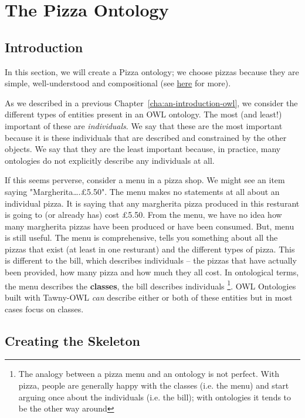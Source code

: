 \chapter{The Pizza Ontology}
\label{cha:pizza-ontology}

\section{Introduction}
\label{sec:introduction}

In this section, we will create a Pizza ontology; we choose pizzas because
they are simple, well-understood and compositional (see
\href{http://robertdavidstevens.wordpress.com/2010/01/22/why-the-pizza-ontology-tutorial/}{here}
for more).

As we described in a previous Chapter~\ref{cha:an-introduction-owl},
we consider the different types of entities present in an OWL
ontology. The most (and least!) important of these are
\emph{individuals}. We say that these are the most important because
it is these individuals that are described and constrained by the
other objects. We say that they are the least important because, in
practice, many ontologies do not explicitly describe any individuals
at all.

If this seems perverse, consider a menu in a pizza shop. We might see
an item saying "Margherita\ldots{}.£5.50". The menu makes no
statements at all about an individual pizza. It is saying that any
margherita pizza produced in this resturant is going to (or already
has) cost £5.50. From the menu, we have no idea how many margherita
pizzas have been produced or have been consumed. But, menu is still
useful. The menu is comprehensive, tells you something about all the
pizzas that exist (at least in one resturant) and the different types
of pizza. This is different to the bill, which describes individuals
-- the pizzas that have actually been provided, how many pizza and how
much they all cost.  In ontological terms, the menu describes the
\textbf{classes}, the bill describes individuals \footnote{The analogy
  between a pizza menu and an ontology is not perfect. With pizza,
  people are generally happy with the classes (i.e. the menu) and
  start arguing once about the individuals (i.e. the bill); with
  ontologies it tends to be the other way around}. OWL Ontologies
built with Tawny-OWL \emph{can} describe either or both of these
entities but in most cases focus on classes.

\section{Creating the Skeleton}

